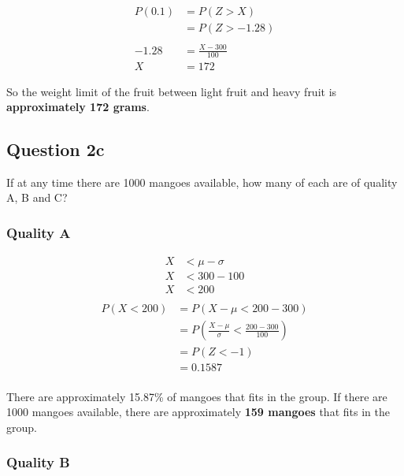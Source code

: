 \documentclass[
  11pt, %
]{assignment}
\begin{document}
\begin{align*}
  P (0.1) & = P(Z > X)            \\
          & = P(Z > -1.28)        \\
  \\
  -1.28   & = \frac{X - 300}{100} \\
  X       & =172
\end{align*}

So the weight limit of the fruit between light fruit and heavy fruit is \textbf{approximately 172 grams}.


\subsection*{Question 2c}
\begin{problem}
If at any time there are 1000 mangoes available, how many of each are of quality A, B and C\@?
\end{problem}

\subsubsection*{Quality A}

\begin{align*}
  X & < \mu - \sigma \\
  X & < 300 - 100    \\
  X & < 200          \\
\end{align*}
\begin{align*}
  P(X < 200) & = P ( X - \mu < 200 - 300)                             \\
             & = P ( \frac{X - \mu}{\sigma} < \frac{200 - 300}{100} ) \\
             & = P ( Z < -1 )                                         \\
             & = 0.1587                                               \\
\end{align*}

There are approximately 15.87\% of mangoes that fits in the group. If there are 1000 mangoes available, there are approximately \textbf{159 mangoes} that fits in the group.

\subsubsection*{Quality B}
\end{document}

